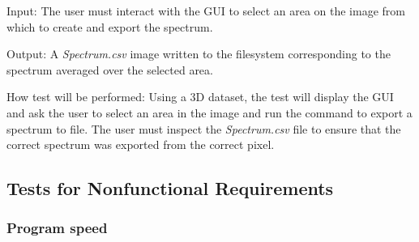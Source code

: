 \documentclass[12pt, titlepage]{article}
\begin{document}
\begin{enumerate}
Input: The user must interact with the GUI to select an area on the image from
which to create and export the spectrum.

Output: A \textit{Spectrum.csv} image written to the filesystem corresponding to
the spectrum averaged over the selected area.

How test will be performed: Using a 3D dataset, the test will display the GUI
and ask the user to select an area in the image and run the command to export a
spectrum to file. The user must inspect the \textit{Spectrum.csv} file to ensure
that the correct spectrum was exported from the correct pixel.\\

\end{enumerate}


\subsection{Tests for Nonfunctional Requirements}
\label{subsec:NonfuncReqTest}

\subsubsection{Program speed}
\end{document}
